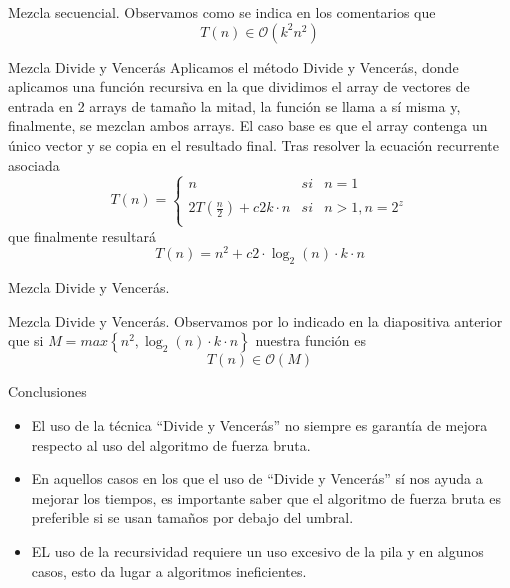 \documentclass[10pt, xcolor=table]{beamer}
\begin{document}
\begin{frame}[fragile]{Mezcla secuencial. }
Observamos como se indica en los comentarios que 
\[
	T(n) \in \mathcal{O}(k^2n^2)
\]
\end{frame}









\begin{frame}[fragile]{Mezcla Divide y Vencerás}
Aplicamos el método Divide y Vencerás, donde aplicamos una función recursiva en la que dividimos el array de vectores de entrada en 2 arrays de tamaño la mitad, la función se llama a sí misma y, finalmente, se mezclan ambos arrays. El caso base es que el array contenga un único vector y se copia en el resultado final. Tras resolver la ecuación recurrente asociada
\[
 	T(n)= \left\{ \begin{array}{lcc}
             n  &   si  & n = 1 \\
             \\ 2T(\frac{n}{2}) + c2k \cdot n &  si & n > 1, n=2^z \\
             \end{array}
   \right.
 \]
  que finalmente resultará
  \[
 	T(n) =  n^2 + c2\cdot\log_{2}(n) \cdot k \cdot n
 \]

\end{frame}

\begin{frame}[fragile]{Mezcla Divide y Vencerás. }

\end{frame}

\begin{frame}[fragile]{Mezcla Divide y Vencerás. }
Observamos por lo indicado en la diapositiva anterior que si $M = max \left\lbrace n^2, \log_{2}(n) \cdot k \cdot n \right\rbrace $ nuestra función es
\[
	T(n) \in \mathcal{O}(M)
\]
\end{frame}



\begin{frame}{Conclusiones}

	\begin{itemize}
	\item El uso de la técnica ``Divide y Vencerás'' no siempre es garantía de mejora respecto al uso del algoritmo de fuerza bruta.
	
	\item En aquellos casos en los que el uso de ``Divide y Vencerás'' sí nos ayuda a mejorar los tiempos, es importante saber que el algoritmo de fuerza bruta es preferible si se usan tamaños por debajo del umbral.
	
	\item EL uso de la recursividad requiere un uso excesivo de la pila y en algunos casos, esto da lugar a algoritmos ineficientes.
	
		
\end{itemize}		
\end{frame}
\end{document}
